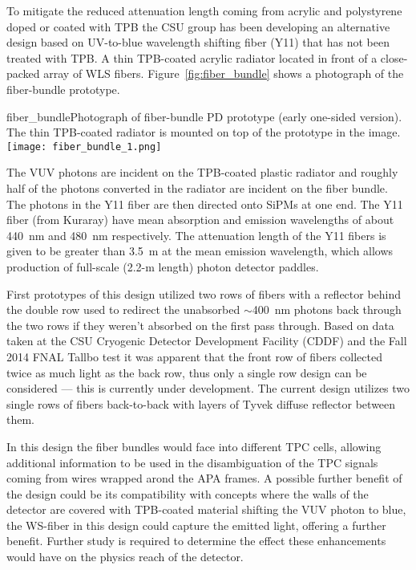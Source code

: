 To mitigate the reduced attenuation length coming from acrylic and
polystyrene doped or coated with TPB the CSU group has been developing
an alternative design based on UV-to-blue wavelength shifting fiber
(Y11) that has not been treated with TPB.  A thin TPB-coated acrylic
radiator located in front of a close-packed array of WLS
fibers. Figure~\ref{fig:fiber_bundle} shows a photograph of the
fiber-bundle prototype.

\begin{cdrfigure}{fiber_bundle}{Photograph of fiber-bundle PD prototype (early one-sided
  version). The thin TPB-coated radiator is mounted on top of the
  prototype in the image.}
  \texttt{[image: fiber\_bundle\_1.png]}
\end{cdrfigure}

The VUV photons are incident on the TPB-coated plastic radiator and
roughly half of the photons converted in the radiator are incident on
the fiber bundle. The photons in the Y11 fiber are then directed onto
SiPMs at one end. The Y11 fiber (from Kuraray) have mean absorption
and emission wavelengths of about 440~nm and 480~nm respectively.  The
attenuation length of the Y11 fibers is given to be greater than 3.5~m
at the mean emission wavelength, which allows production of full-scale
(2.2-m length) photon detector paddles.

First prototypes of this design utilized two rows of fibers with a
reflector behind the double row used to redirect the unabsorbed
$\sim$400~nm photons back through the two rows if they weren't
absorbed on the first pass through.  Based on data taken at the CSU
Cryogenic Detector Development Facility (CDDF) and the Fall 2014 FNAL
Tallbo test it was apparent that the front row of fibers collected
twice as much light as the back row, thus only a single row design can
be considered --- this is currently under development. The current
design utilizes two single rows of fibers back-to-back with layers of
Tyvek diffuse reflector between them.

In this design the fiber bundles would face into different TPC cells,
allowing additional information to be used in the disambiguation of
the TPC signals coming from wires wrapped arond the APA frames. A
possible further benefit of the design could be its compatibility with
concepts where the walls of the detector are covered with TPB-coated
material shifting the VUV photon to blue, the WS-fiber in this design
could capture the emitted light, offering a further benefit. Further
study is required to determine the effect these enhancements would
have on the physics reach of the detector.

